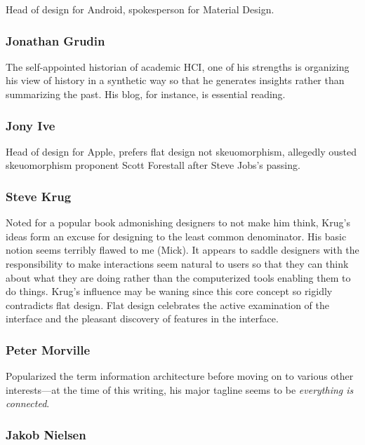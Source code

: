 Head of design for Android, spokesperson for Material Design.

\hypertarget{jonathan-grudin}{%
\subsubsection{Jonathan Grudin}\label{jonathan-grudin}}

The self-appointed historian of academic HCI, one of his strengths is
organizing his view of history in a synthetic way so that he generates
insights rather than summarizing the past. His blog, for instance, is
essential reading.

\hypertarget{jony-ive}{%
\subsubsection{Jony Ive}\label{jony-ive}}

Head of design for Apple, prefers flat design not skeuomorphism,
allegedly ousted skeuomorphism proponent Scott Forestall after Steve
Jobs's passing.

\hypertarget{steve-krug}{%
\subsubsection{Steve Krug}\label{steve-krug}}

Noted for a popular book admonishing designers to not make him think,
Krug's ideas form an excuse for designing to the least common
denominator. His basic notion seems terribly flawed to me (Mick). It
appears to saddle designers with the responsibility to make interactions
seem natural to users so that they can think about what they are doing
rather than the computerized tools enabling them to do things. Krug's
influence may be waning since this core concept so rigidly contradicts
flat design. Flat design celebrates the active examination of the
interface and the pleasant discovery of features in the interface.

\hypertarget{peter-morville}{%
\subsubsection{Peter Morville}\label{peter-morville}}

Popularized the term information architecture before moving on to
various other interests---at the time of this writing, his major tagline
seems to be \emph{everything is connected}.

\hypertarget{jakob-nielsen}{%
\subsubsection{Jakob Nielsen}\label{jakob-nielsen}}

